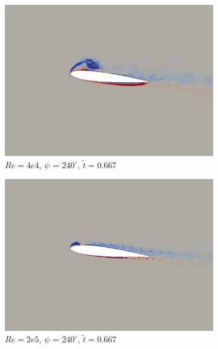 \begin{figure}[H]
	\begin{subfigure}[b]{0.32\textwidth}
		\centering
		\includegraphics[width=1\textwidth]{figures/Vorticity_plots/Re_40k_1pt0/phase_240.png}
		\caption{$Re=4e4$, $\psi$ = $240^\circ$, $\tilde{t}=0.667$}
		\label{fig:Re_40k_1pt0_phi240}
	\end{subfigure}
	\begin{subfigure}[b]{0.32\textwidth}
		\centering
		\includegraphics[width=1\textwidth]{figures/Vorticity_plots/Re_200k_1pt0/phase_240.png}
		\caption{$Re=2e5$, $\psi$ = $240^\circ$, $\tilde{t}=0.667$}
		\label{fig:Re_200k_1pt0_phi240}
	\end{subfigure}
	\begin{subfigure}[b]{0.32\textwidth}
		\centering

\end{subfigure}
\end{figure}
